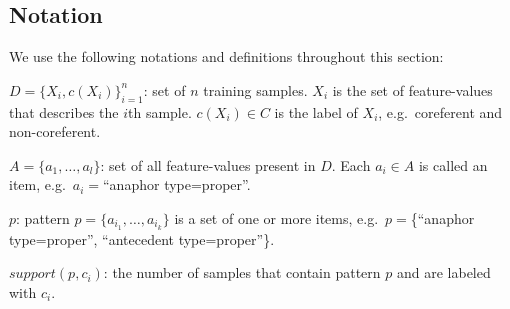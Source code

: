 %
\subsection{Notation}
\label{sect:back}
We use the following notations and definitions throughout this section:
\squishlist
\item $D=\{X_i,c(X_i)\}_{i=1}^n$: set of $n$ training samples. 
$X_i$ is the set of feature-values that describes the $i$th sample. 
$c(X_i) \in C$ is the label of $X_i$, e.g.\ coreferent and non-coreferent.
\item $A=\{a_1,\dots,a_l\}$: set of all feature-values present in $D$.
Each $a_i \in A$ is called an item, e.g.\ $a_i=$``anaphor type=proper''.
\item $p$: pattern $p=\{a_{i_1},\dots, a_{i_k}\}$ is a set of one or more items, e.g.\ $p=$\{``anaphor type=proper'', ``antecedent type=proper''\}. 
\item $support(p,c_i)$: the number of samples that contain pattern $p$ and are labeled with $c_i$. 
\squishend

